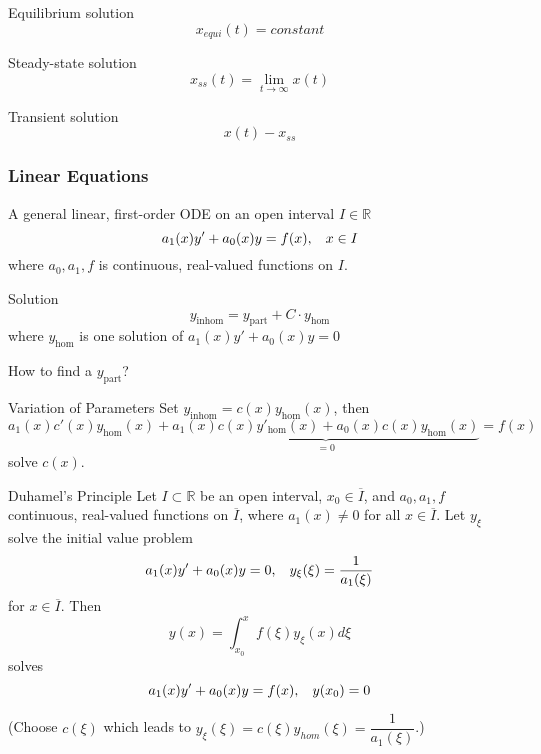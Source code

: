 \documentclass{beamer}
\begin{document}
\begin{frame}
\begin{block}{Equilibrium solution}
$$x_{equi}(t)=constant$$
\end{block}

\begin{block}{Steady-state solution}
$$x_{ss}(t)=\lim_{t\rightarrow\infty}x(t)$$
\end{block}

\begin{block}{Transient solution}
$$x(t)-x_{ss}$$
\end{block}
\end{frame}


\begin{frame}
\frametitle{Linear Equations}
A general linear, first-order ODE on an open interval $I\in\mathbb{R}$
$$a_1(x)y'+a_0(x)y=f(x),\hspace{3mm}x\in I $$
where $a_0,a_1,f$ is continuous, real-valued functions on $I$.
\end{frame}

\begin{frame}
\begin{block}{Solution}
$$y_{\text{inhom}}=y_{\text{part}}+C\cdot y_{\text{hom}}$$
where 
$y_{\text{hom}}$ is one solution of $a_1(x)y'+a_0(x)y=0$
\end{block}
\begin{block}{How to find a $y_{\text{part}}$?}
\end{block}
\end{frame}

\begin{frame}
\begin{block}{Variation of Parameters}
Set $y_{\text{inhom}}=c(x)y_{\text{hom}}(x)$, then
$$a_1(x)c'(x)y_{\text{hom}}(x)+\underbrace{a_1(x)c(x)y'_{\text{hom}}(x)+a_0(x)c(x)y_{\text{hom}}(x)}_{=0}=f(x)$$
solve $c(x)$.
\end{block}
\end{frame}

\begin{frame}
\begin{block}{Duhamel's Principle}
Let $I\subset\mathbb{R}$ be an open interval, $x_0\in\overline{I}$, and $a_0,a_1,f$ continuous, real-valued functions on $\overline{I}$, where $a_1(x)\neq0$ for all $x\in\overline{I}$. Let $y_{\xi}$ solve the initial value problem
$$a_1(x)y'+a_0(x)y=0,\hspace{3mm}y_{\xi}(\xi)=\dfrac{1}{a_1(\xi)}$$
for $x\in\overline{I}$. Then
$$y(x)=\int_{x_0}^xf(\xi)y_{\xi}(x)d\xi$$
solves
$$a_1(x)y'+a_0(x)y=f(x),\hspace{3mm}y(x_0)=0$$
\end{block}
\begin{block}{}
(Choose $c(\xi)$ which leads to $y_{\xi}(\xi)=c(\xi)y_{hom}(\xi)=\dfrac{1}{a_1(\xi)}$.)
\end{block}
\end{frame}
\end{document}
